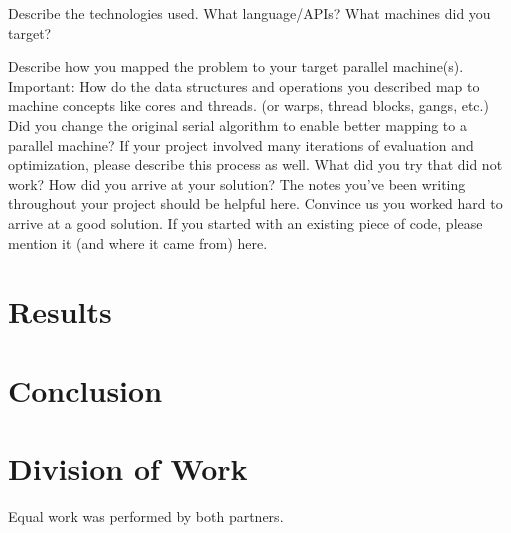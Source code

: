 \documentclass[11pt]{article}
\begin{document}
Describe the technologies used. What language/APIs? What machines did you
target?

Describe how you mapped the problem to your target parallel machine(s).
Important: How do the data structures and operations you described map to
machine concepts like cores and threads. (or warps, thread blocks, gangs, etc.)
Did you change the original serial algorithm to enable better mapping to a
parallel machine? If your project involved many iterations of evaluation and
optimization, please describe this process as well. What did you try that did
not work? How did you arrive at your solution? The notes you’ve been writing
throughout your project should be helpful here. Convince us you worked hard to
arrive at a good solution. If you started with an existing piece of code, please
mention it (and where it came from) here.

\section*{Results}

\section*{Conclusion}

\section*{Division of Work}
Equal work was performed by both partners.


\end{document}
